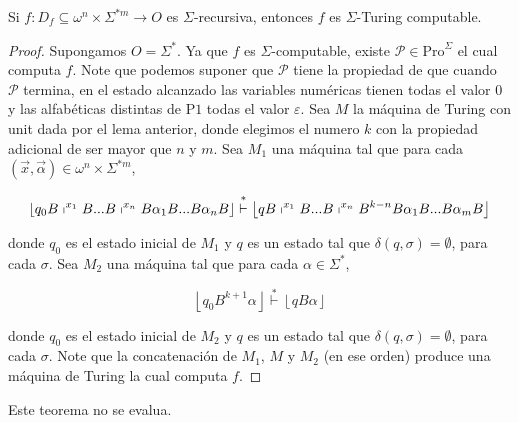 	\begin{theorem}
		Si $f:D_{f}\subseteq \omega ^{n}\times \Sigma ^{\ast m}\rightarrow O$ es $ \Sigma $-recursiva, entonces $f$ es
    $\Sigma $-Turing computable.

  \begin{proof} Supongamos $O=\Sigma ^{\ast }.$ Ya que $f$ es $\Sigma $-computable, existe
    $ \mathcal{P}\in \mathrm{Pro}^{\Sigma }$ el cual computa $f$. Note que podemos suponer que $\mathcal{P}$ tiene la
    propiedad de que cuando $\mathcal{P}$ termina, en el estado alcanzado las variables numéricas tienen todas el valor
    $0$ y las alfabéticas distintas de $\mathrm{P}1$ todas el valor $ \varepsilon $. Sea $M$ la máquina de Turing con
    unit dada por el lema anterior, donde elegimos el numero $k$ con la propiedad adicional de ser mayor que $n$ y $m$.
    Sea $M_{1}$ una máquina tal que para cada $(\vec{x}, \vec{\alpha})\in \omega ^{n}\times \Sigma ^{\ast m}$,

  	\[
    \displaystyle \left\lfloor q_{0}B\shortmid ^{x_{1}}B...B\shortmid
    ^{x_{n}}B\alpha _{1}B...B\alpha _{n}B\right\rfloor \overset{\ast }{\vdash }\left\lfloor qB\shortmid
    ^{x_{1}}B...B\shortmid ^{x_{n}}B^{k-n}B\alpha _{1}B...B\alpha _{m}B\right\rfloor
  	\]

    donde $q_{0}$ es el estado inicial de $M_{1}$ y $q$ es un estado tal que $ \delta (q,\sigma )=\emptyset $, para cada
    $\sigma .$ Sea $M_{2}$ una máquina tal que para cada $\alpha \in \Sigma ^{\ast }$,

  	\[
    \displaystyle \left\lfloor q_{0}B^{k+1}\alpha \right\rfloor \overset{\ast }{\vdash } \left\lfloor qB\alpha \right\rfloor
  	\]

    donde $q_{0}$ es el estado inicial de $M_{2}$ y $q$ es un estado tal que $ \delta (q,\sigma )=\emptyset $, para cada
    $\sigma $. Note que la concatenación de $M_{1}$, $M$ y $M_{2}$ (en ese orden) produce una máquina de Turing la cual
    computa $f$.
	\end{proof}
	\end{theorem}

  \begin{theorem}
    \par Este teorema no se evalua.
  \end{theorem}
